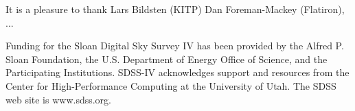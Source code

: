 \documentclass[modern]{aastex63}
\begin{document}




%
%
%
%
%


\acknowledgements

It is a pleasure to thank
Lars Bildsten (KITP)
Dan Foreman-Mackey (Flatiron),
...

Funding for the Sloan Digital Sky Survey IV has been provided by the Alfred P.
Sloan Foundation, the U.S. Department of Energy Office of Science, and the
Participating Institutions. SDSS-IV acknowledges support and resources from the
Center for High-Performance Computing at the University of Utah. The SDSS web
site is www.sdss.org.
\end{document}
